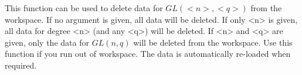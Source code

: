 This function can be used to delete data for $GL(<n>, <q>)$ from the {\GAP} workspace. If no argument
is given, all data will be deleted. If only <n> is given, all data for degree <n> (and any <q>) will
be deleted. If <n> and <q> are given, only the data for $GL(n, q)$ will be deleted from the {\GAP}
workspace. Use this function if you run out of {\GAP} workspace. The
data is automatically re-loaded when required.


